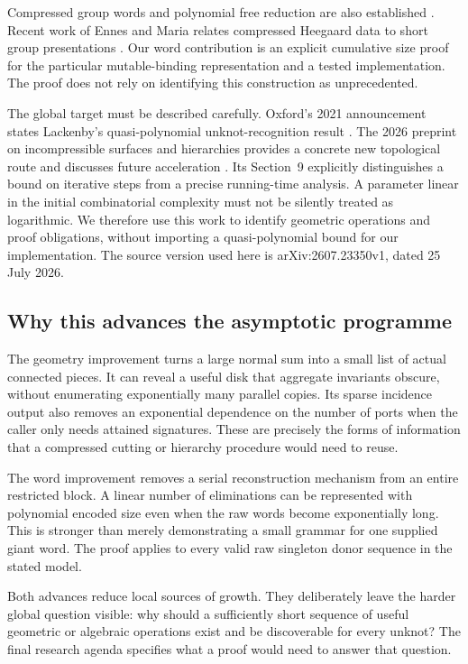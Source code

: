 \documentclass[11pt,a4paper]{article}
\theoremstyle{definition}
\theoremstyle{remark}
\begin{document}
Compressed group words and polynomial free reduction are also established
\cite{schleimer2008}. Recent work of Ennes and Maria relates compressed
Heegaard data to short group presentations \cite{ennesmaria2025}. Our
word contribution is an explicit cumulative size proof for the particular
mutable-binding representation and a tested implementation. The proof
does not rely on identifying this construction as unprecedented.

The global target must be described carefully. Oxford's 2021 announcement
states Lackenby's quasi-polynomial unknot-recognition result
\cite{lackenby2021}. The 2026 preprint on incompressible surfaces and
hierarchies provides a concrete new topological route and discusses future
acceleration \cite{lackenby2026}. Its Section~9 explicitly distinguishes a
bound on iterative steps from a precise running-time analysis. A parameter
linear in the initial combinatorial complexity must not be silently treated
as logarithmic. We therefore use this work to identify geometric operations
and proof obligations, without importing a quasi-polynomial bound for our
implementation. The source version used here is arXiv:2607.23350v1,
dated 25 July 2026.

\subsection{Why this advances the asymptotic programme}

The geometry improvement turns a large normal sum into a small list of
actual connected pieces. It can reveal a useful disk that aggregate
invariants obscure, without enumerating exponentially many parallel
copies. Its sparse incidence output also removes an exponential dependence
on the number of ports when the caller only needs attained signatures.
These are precisely the forms of information that a compressed cutting
or hierarchy procedure would need to reuse.

The word improvement removes a serial reconstruction mechanism from an
entire restricted block. A linear number of eliminations can be represented
with polynomial encoded size even when the raw words become exponentially
long. This is stronger than merely demonstrating a small grammar for one
supplied giant word. The proof applies to every valid raw singleton donor
sequence in the stated model.

Both advances reduce local sources of growth. They deliberately leave the
harder global question visible: why should a sufficiently short sequence
of useful geometric or algebraic operations exist and be discoverable for
every unknot? The final research agenda specifies what a proof would need
to answer that question.
\end{document}
